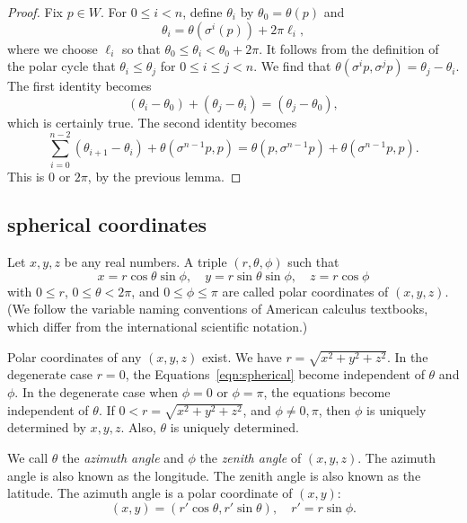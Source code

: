 \begin{proof}
Fix $p\in W$.
For $0\le i<n$, define $\theta_i$ by
   $\theta_0=\theta(p)$ and 
   $$\theta_i = \theta(\sigma^i(p)) + 2\pi \ell_i,$$
where we choose $\ell_i$ so that $\theta_0\le \theta_i < \theta_0+2\pi$.
It follows from the definition of the polar cycle that
$\theta_i \le \theta_j$ for $0\le i\le j < n$. We find that
$\theta(\sigma^i p ,\sigma^j p) = \theta_j - \theta_i$.
The first identity becomes
  $$
  (\theta_i-\theta_0) + (\theta_j-\theta_i) = (\theta_j-\theta_0),
  $$
which is certainly true.
The second identity becomes
  $$
  \sum_{i=0}^{n-2} (\theta_{i+1}-\theta_i) + \theta(\sigma^{n-1}p,p)
  = \theta(p,\sigma^{n-1}p) + \theta(\sigma^{n-1}p,p).
  $$
This is $0$ or $2\pi$, by the previous lemma.
\end{proof}

\subsection{spherical coordinates}
\label{sec:spherical}



\begin{definition}
Let $x,y,z$ be any real numbers.  A
triple $(r,\theta,\phi)$ such that
    \begin{equation}
    \label{eqn:spherical}
    x = r\cos\theta\sin\phi,\quad y = r\sin\theta\sin\phi,\quad
    z = r\cos\phi
    \end{equation}
with $0\le r$, $0\le\theta<2\pi$, and $0\le\phi\le\pi$ are called
polar coordinates of $(x,y,z)$.  (We follow the variable
naming conventions of American calculus textbooks, which differ
from the international scientific notation.)
\end{definition}

Polar coordinates of any $(x,y,z)$ exist.
We have $r = \sqrt{x^2+y^2+z^2}$.  In the degenerate case $r=0$,
the Equations~\ref{eqn:spherical} become independent of $\theta$
and $\phi$. In the degenerate case when $\phi = 0$ or $\phi =
\pi$, the equations become independent of $\theta$. If $0<r =
\sqrt{x^2+y^2+z^2}$, and $\phi\ne 0,\pi$,  then $\phi$ is uniquely
determined by $x,y,z$. Also, $\theta$ is uniquely determined.


We call $\theta$ the {\it azimuth angle\/} and $\phi$ the {\it
zenith angle\/} of $(x,y,z)$.  The azimuth angle is also known as
the longitude.  The zenith angle is also known as the latitude. The
azimuth angle is a polar coordinate of $(x,y)$:
    $$
    (x,y) = (r'\cos\theta,r'\sin\theta), \quad r' = r\sin\phi.
    $$


